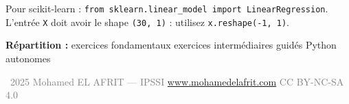 \begin{intuitionbox}[Indice]
    Pour scikit-learn : \texttt{from sklearn.linear\_model import LinearRegression}.
    L'entr\'{e}e \texttt{X} doit avoir le shape \texttt{(30, 1)} :
    utilisez \texttt{x.reshape(-1, 1)}.
\end{intuitionbox}

\vfill
\separateur

\begin{center}
    \small\sffamily
    \textbf{R\'{e}partition :} exercices  fondamentaux  exercices  interm\'{e}diaires  guid\'{e}s Python   autonomes 
\end{center}

\begin{center}
    {\footnotesize\sffamily\textcolor{gray}{%
        \textcopyright\ 2025 Mohamed EL AFRIT --- IPSSI \enspace\textbullet\enspace
        \url{www.mohamedelafrit.com} \enspace\textbullet\enspace
        CC BY-NC-SA 4.0
    }}
\end{center}


